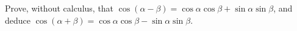 Prove, without calculus, that $\cos(\alpha-\beta)=\cos\alpha\cos\beta+\sin\alpha\sin\beta$, and deduce $\cos(\alpha+\beta)=\cos\alpha\cos\beta-\sin\alpha\sin\beta$.
